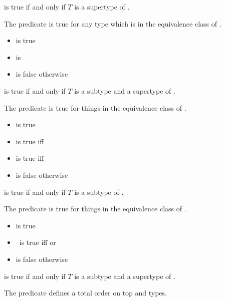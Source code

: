 \documentclass[makeidx]{article}
\begin{document}
{ is true if and only if $T$ is a supertype of .

The \IsObjectTypeName{} predicate is true for any type which is in the equivalence class
of .

\begin{itemize}
\item {} is true
\item {} is 
\item {} is false otherwise
\end{itemize}

 is true if and only if $T$ is a subtype and a supertype of
.

The \IsBottomTypeName{} predicate is true for things in the equivalence class of .

\begin{itemize}
\item {} is true
\item {} is true iff 
\item {} is true iff 
\item {} is false otherwise
\end{itemize}

 is true if and only if $T$ is a subtype of .

The \IsNullTypeName{} predicate is true for things in the equivalence class of .

\begin{itemize}
\item {} is true
\item {}\ is true iff  or 
\item {} is false otherwise
\end{itemize}

 is true if and only if $T$ is a subtype and a supertype of .

The \IsMoreTopTypeName{} predicate defines a total order on top and  types.

}
\end{document}
